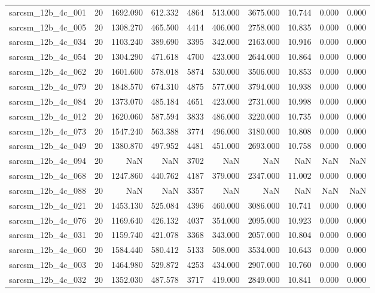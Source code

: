 \begin{tabular}{lrrrrrrrrr}
sarcsm\_12b\_4c\_001 & 20 & 1692.090 & 612.332 & 4864 & 513.000 & 3675.000 & 10.744 & 0.000 & 0.000 \\
sarcsm\_12b\_4c\_005 & 20 & 1308.270 & 465.500 & 4414 & 406.000 & 2758.000 & 10.835 & 0.000 & 0.000 \\
sarcsm\_12b\_4c\_034 & 20 & 1103.240 & 389.690 & 3395 & 342.000 & 2163.000 & 10.916 & 0.000 & 0.000 \\
sarcsm\_12b\_4c\_054 & 20 & 1304.290 & 471.618 & 4700 & 423.000 & 2644.000 & 10.864 & 0.000 & 0.000 \\
sarcsm\_12b\_4c\_062 & 20 & 1601.600 & 578.018 & 5874 & 530.000 & 3506.000 & 10.853 & 0.000 & 0.000 \\
sarcsm\_12b\_4c\_079 & 20 & 1848.570 & 674.310 & 4875 & 577.000 & 3794.000 & 10.938 & 0.000 & 0.000 \\
sarcsm\_12b\_4c\_084 & 20 & 1373.070 & 485.184 & 4651 & 423.000 & 2731.000 & 10.998 & 0.000 & 0.000 \\
sarcsm\_12b\_4c\_012 & 20 & 1620.060 & 587.594 & 3833 & 486.000 & 3220.000 & 10.735 & 0.000 & 0.000 \\
sarcsm\_12b\_4c\_073 & 20 & 1547.240 & 563.388 & 3774 & 496.000 & 3180.000 & 10.808 & 0.000 & 0.000 \\
sarcsm\_12b\_4c\_049 & 20 & 1380.870 & 497.952 & 4481 & 451.000 & 2693.000 & 10.758 & 0.000 & 0.000 \\
sarcsm\_12b\_4c\_094 & 20 & NaN & NaN & 3702 & NaN & NaN & NaN & NaN & NaN \\
sarcsm\_12b\_4c\_068 & 20 & 1247.860 & 440.762 & 4187 & 379.000 & 2347.000 & 11.002 & 0.000 & 0.000 \\
sarcsm\_12b\_4c\_088 & 20 & NaN & NaN & 3357 & NaN & NaN & NaN & NaN & NaN \\
sarcsm\_12b\_4c\_021 & 20 & 1453.130 & 525.084 & 4396 & 460.000 & 3086.000 & 10.741 & 0.000 & 0.000 \\
sarcsm\_12b\_4c\_076 & 20 & 1169.640 & 426.132 & 4037 & 354.000 & 2095.000 & 10.923 & 0.000 & 0.000 \\
sarcsm\_12b\_4c\_031 & 20 & 1159.740 & 421.078 & 3368 & 343.000 & 2057.000 & 10.804 & 0.000 & 0.000 \\
sarcsm\_12b\_4c\_060 & 20 & 1584.440 & 580.412 & 5133 & 508.000 & 3534.000 & 10.643 & 0.000 & 0.000 \\
sarcsm\_12b\_4c\_003 & 20 & 1464.980 & 529.872 & 4253 & 434.000 & 2907.000 & 10.760 & 0.000 & 0.000 \\
sarcsm\_12b\_4c\_032 & 20 & 1352.030 & 487.578 & 3717 & 419.000 & 2849.000 & 10.841 & 0.000 & 0.000 \\

\end{tabular}
